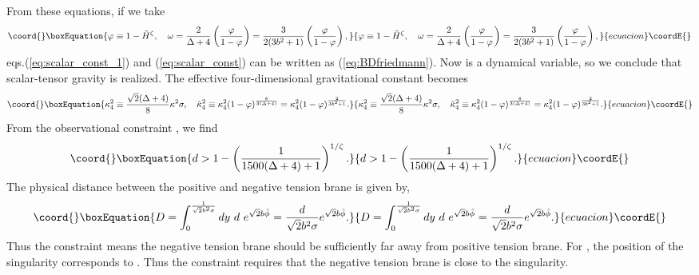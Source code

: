 \documentclass[a4paper,11pt]{article}
\begin{document}
From these equations, if we take
\begin{equation}\coord{}\boxEquation{
\varphi \equiv 1-\tilde{H}^{\zeta}, \quad
\omega = \frac{2}{\Delta +4} \left( \frac{\varphi}{1-\varphi} \right)
=\frac{3}{2(3 b^2+1)} \left( \frac{\varphi}{1 -\varphi} \right),
}{
\varphi \equiv 1-\tilde{H}^{\zeta}, \quad
\omega = \frac{2}{\Delta +4} \left( \frac{\varphi}{1-\varphi} \right)
=\frac{3}{2(3 b^2+1)} \left( \frac{\varphi}{1 -\varphi} \right),
}{ecuacion}\coordE{}\end{equation}
eqs.(\ref{eq:scalar_const_1}) and (\ref{eq:scalar_const}) can be 
written as (\ref{eq:BDfriedmann}).
Now \myHighlight{$\omega$}\coordHE{} is a dynamical variable, so we conclude that scalar-tensor 
gravity is realized. 
The effective four-dimensional gravitational constant becomes 
\begin{equation}\coord{}\boxEquation{
\kappa_4^2 \equiv \frac{\sqrt{2}(\Delta +4)}{8}\kappa^2 \sigma,\quad 
\tilde{\kappa}_4^2 
\equiv \kappa_4^2(1-\varphi)^{\frac{8}{3(\Delta+4)}}=
\kappa_4^2 (1-\varphi)^{\frac{2}{3 b^2+1}}.
}{
\kappa_4^2 \equiv \frac{\sqrt{2}(\Delta +4)}{8}\kappa^2 \sigma,\quad 
\tilde{\kappa}_4^2 
\equiv \kappa_4^2(1-\varphi)^{\frac{8}{3(\Delta+4)}}=
\kappa_4^2 (1-\varphi)^{\frac{2}{3 b^2+1}}.
}{ecuacion}\coordE{}\end{equation}
From the observational constraint \coordHE{}, we find 
\begin{equation}\coord{}\boxEquation{
d > 1 - \left(\frac{1}{1500(\Delta +4)+1} \right)^{1/\zeta}. 
}{
d > 1 - \left(\frac{1}{1500(\Delta +4)+1} \right)^{1/\zeta}. 
}{ecuacion}\coordE{}\end{equation}
The physical distance \coordHE{} between the positive and negative tension brane 
is given by, 
\begin{equation}\coord{}\boxEquation{
D = \int_0^{\frac{1}{\sqrt{2}b^2 \sigma}} dy \ d \ e^{\sqrt{2}b\hat{\phi}} 
= \frac{d}{\sqrt{2}b^2 \sigma} e^{\sqrt{2}b\hat{\phi}} .
}{
D = \int_0^{\frac{1}{\sqrt{2}b^2 \sigma}} dy \ d \ e^{\sqrt{2}b\hat{\phi}} 
= \frac{d}{\sqrt{2}b^2 \sigma} e^{\sqrt{2}b\hat{\phi}} .
}{ecuacion}\coordE{}\end{equation}
Thus the constraint means the negative tension brane should be
sufficiently far away from positive tension brane. For \coordHE{},
the position of the singularity corresponds to \coordHE{}. Thus the 
constraint requires that the negative tension brane is close to 
the singularity.
\end{document}
